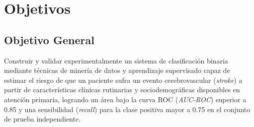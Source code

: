 \documentclass[12pt,a4paper]{article}
\begin{document}
\section{Objetivos}

\subsection{Objetivo General}
Construir y validar experimentalmente un sistema de clasificación binaria mediante técnicas de minería de datos y aprendizaje supervisado capaz de estimar el riesgo de que un paciente sufra un evento cerebrovascular (\textit{stroke}) a partir de características clínicas rutinarias y sociodemográficas disponibles en atención primaria, logrando un área bajo la curva ROC (\textit{AUC-ROC}) superior a 0.85 y una sensibilidad (\textit{recall}) para la clase positiva mayor a 0.75 en el conjunto de prueba independiente.
\end{document}
